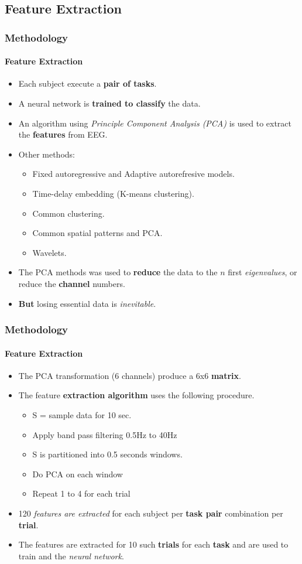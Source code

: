 \subsection{Feature Extraction}
\frame
{
\frametitle{Methodology}
\framesubtitle{Feature Extraction}
\begin{itemize}
	\item Each subject execute a \textbf{pair of tasks}.
	\item A neural network is \textbf{trained to classify} the data.
	\item An algorithm using \emph{Principle Component Analysis (PCA)} is used to extract the \textbf{features} from EEG.
	\item Other methods:
	\begin{itemize}
		\item Fixed autoregressive and Adaptive autorefresive models.
		\item Time-delay embedding (K-means clustering).
		\item Common clustering.
		\item Common spatial patterns and PCA.
		\item Wavelets.
	\end{itemize}
	\item The PCA methods was used to \textbf{reduce} the data to the $n$ first \emph{eigenvalues}, or reduce the \textbf{channel} numbers.
	\item \textbf{But} losing essential data is \emph{inevitable}.
\end{itemize}
}

\frame
{
\frametitle{Methodology}
\framesubtitle{Feature Extraction}
\begin{itemize}
	\item The PCA transformation (6 channels) produce a 6x6 \textbf{matrix}.
	\item The feature \textbf{extraction algorithm} uses the following procedure.
	\begin{itemize}
		\item S = sample data for 10 sec.
		\item Apply band pass filtering 0.5Hz to 40Hz
		\item S is partitioned into 0.5 seconds windows.
		\item Do PCA on each window
		\item Repeat 1 to 4 for each trial
	\end{itemize}
	\item 120 \emph{features are extracted} for each subject per \textbf{task pair} combination per \textbf{trial}.
	\item The features are extracted for 10 such \textbf{trials} for each \textbf{task} and are used to train and the \emph{neural network}.
\end{itemize}
}

